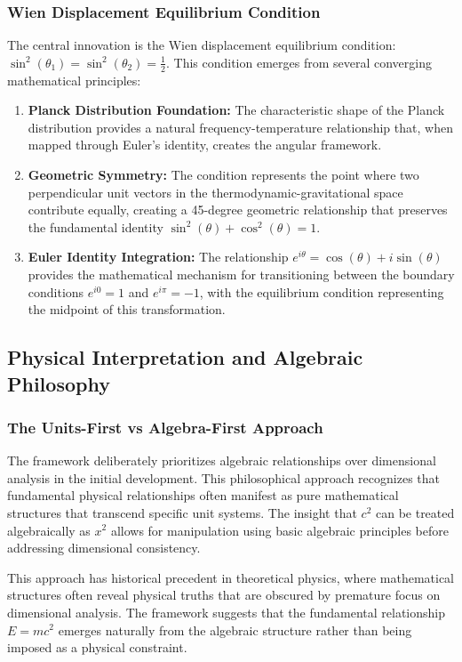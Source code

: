 ﻿\documentclass[12pt]{article}
\begin{document}
\subsubsection{Wien Displacement Equilibrium Condition}
The central innovation is the Wien displacement equilibrium condition: $\sin^2(\theta_1) = \sin^2(\theta_2) = \frac{1}{2}$. This condition emerges from several converging mathematical principles:
\begin{enumerate}
   \item \textbf{Planck Distribution Foundation:} The characteristic shape of the Planck distribution provides a natural frequency-temperature relationship that, when mapped through Euler's identity, creates the angular framework.
   \item \textbf{Geometric Symmetry:} The condition represents the point where two perpendicular unit vectors in the thermodynamic-gravitational space contribute equally, creating a 45-degree geometric relationship that preserves the fundamental identity $\sin^2(\theta) + \cos^2(\theta) = 1$.
   \item \textbf{Euler Identity Integration:} The relationship $e^{i\theta} = \cos(\theta) + i \sin(\theta)$ provides the mathematical mechanism for transitioning between the boundary conditions $e^{i0} = 1$ and $e^{i\pi} = -1$, with the equilibrium condition representing the midpoint of this transformation.
\end{enumerate}

\subsection{Physical Interpretation and Algebraic Philosophy}
\subsubsection{The Units-First vs Algebra-First Approach}
The framework deliberately prioritizes algebraic relationships over dimensional analysis in the initial development. This philosophical approach recognizes that fundamental physical relationships often manifest as pure mathematical structures that transcend specific unit systems. The insight that $c^2$ can be treated algebraically as $x^2$ allows for manipulation using basic algebraic principles before addressing dimensional consistency.

This approach has historical precedent in theoretical physics, where mathematical structures often reveal physical truths that are obscured by premature focus on dimensional analysis. The framework suggests that the fundamental relationship $E = mc^2$ emerges naturally from the algebraic structure rather than being imposed as a physical constraint.
\end{document}
